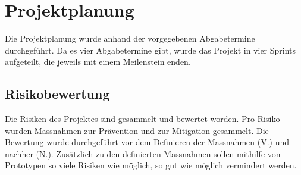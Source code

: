 \section{Projektplanung}

Die Projektplanung wurde anhand der vorgegebenen Abgabetermine durchgeführt.
Da es vier Abgabetermine gibt, wurde das Projekt in vier Sprints aufgeteilt, die jeweils mit einem Meilenstein enden. 

\subsection{Risikobewertung}

Die Risiken des Projektes sind gesammelt und bewertet worden. Pro Risiko wurden Massnahmen zur Prävention und zur Mitigation gesammelt. Die Bewertung wurde durchgeführt vor dem Definieren der Massnahmen (V.) und nachher (N.).
Zusätzlich zu den definierten Massnahmen sollen mithilfe von Prototypen so viele Risiken wie möglich, so gut wie möglich vermindert werden. 

